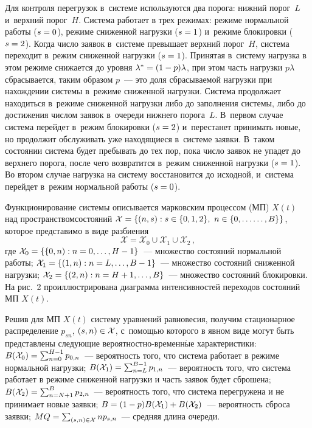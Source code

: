 \begin{multicols}{2}
Для контроля перегрузок в~сис\-те\-ме используются 
два порога: нижний порог~$L$ и~верхний порог~$H$. Система работает в трех режимах: 
режиме нормальной работы ($s\hm=0$), режиме сниженной нагрузки ($s\hm=1$) 
и~режиме блокировки ($s\hm=2$). Когда чис\-ло заявок в~сис\-те\-ме превышает верхний 
порог~$H$, сис\-те\-ма переходит в~режим сниженной нагрузки ($s\hm=1$). Принятая 
в~сис\-те\-му нагрузка в этом режиме снижается до уровня $\lambda^*\hm= (1\hm- p)\lambda$, 
при этом часть нагрузки $p\lambda$ сбрасывается, таким образом $p$~--- это доля 
сбрасываемой нагрузки при нахождении сис\-те\-мы в~режиме сниженной нагрузки. Сис\-те\-ма 
продолжает находиться в~режиме сниженной нагрузки либо до заполнения сис\-те\-мы, либо 
до достижения чис\-лом заявок в~очереди нижнего порога~$L$. В~первом случае сис\-те\-ма 
перейдет в~режим блокировки ($s\hm=2$) и~перестанет принимать новые, но продолжит 
обслуживать уже на\-хо\-дя\-щи\-еся в~сис\-те\-ме заявки. В~таком состоянии сис\-те\-ма будет 
пребывать до тех пор, пока чис\-ло заявок не упадет до верх\-не\-го порога, после чего 
возвратится в~режим сниженной нагрузки ($s\hm=1$). Во втором случае нагрузка на 
систему восстановится до исходной, и~сис\-те\-ма перейдет в~режим нормальной работы 
($s\hm=0$).
{

}
  
  Функционирование системы описывается марковским процессом (МП) $X(t)$ над 
пространством\linebreak состояний $\mathcal{X}\hm= \{ (n,s): s\hm\in \{0,1,2\},\ n\hm\in \{0,\ldots\linebreak
\ldots , B\}\}$, которое представимо в виде раз\-биения 
$$
\mathcal{X}= \mathcal{X}_0\cup 
\mathcal{X}_1 \cup \mathcal{X}_2\,,
$$
 где $\mathcal{X}_0\hm= \{\{ 0,n): n\hm=0,\ldots , 
H\hm-1\}$~--- множество состояний нормальной работы; $\mathcal{X}_1\hm= \{ (1,n): 
n\hm= L,\ldots , B\hm-1\}$~--- множество состояний сниженной нагрузки; 
$\mathcal{X}_2\hm= \{ (2,n): n\hm= H\hm+1,\ldots , B\}$~--- множество состояний 
блокировки. На рис.~2 проиллюстрирована диаграмма интенсивностей переходов 
состояний МП $X(t)$.
  
  Решив для МП $X(t)$ систему уравнений равновесия, получим стационарное 
распределение $p_{sn}$, $(s,n)\hm\in \mathcal{X}$, с~помощью которого в явном виде 
могут быть представлены следующие ве\-ро\-ят\-но\-ст\-но-вре\-мен\-н$\acute{\mbox{ы}}$е характеристики: 
$B(\mathcal{X}_0)\hm= \sum\nolimits_{n=0}^{H-1} p_{0,n}$~---  вероятность того, что 
система работает в режиме нормальной нагрузки; $B(\mathcal{X}_1)\hm= 
\sum\nolimits_{n=L}^{B-1} p_{1,n}$~--- вероятность того, что сис\-те\-ма работает в режиме 
сниженной нагрузки и часть заявок будет сброшена; $B(\mathcal{X}_2)\hm= 
\sum\nolimits_{n=N+1}^B p_{2,n}$~--- вероятность того, что сис\-те\-ма перегружена и не 
принимает новые заявки; $B\hm= (1\hm-p) B(\mathcal{X}_1) \hm+ B(\mathcal{X}_2)$~--- 
вероятность сброса заявки; $MQ\hm= \sum\nolimits_{(s,n)\in \mathcal{X}} np_{s,n}$~--- 
средняя длина очереди.




\end{multicols}
